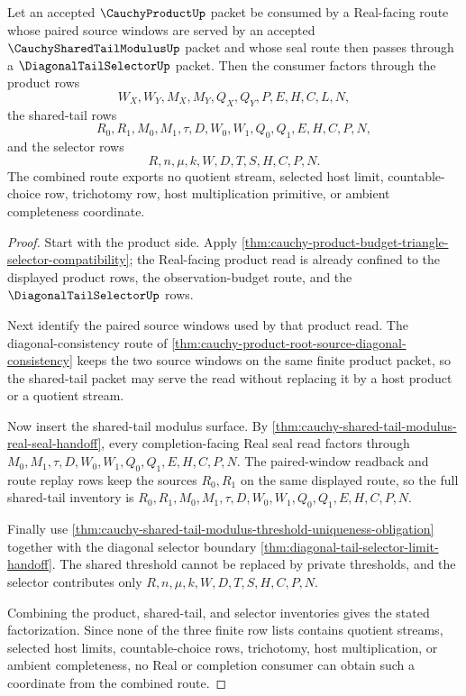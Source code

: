 \begin{theorem}
\label{thm:cauchy-product-shared-tail-selector-factorization}
Let an accepted $\CauchyProductUp$ packet be consumed by a Real-facing route whose paired source windows are served by an accepted $\CauchySharedTailModulusUp$ packet and whose seal route then passes through a $\DiagonalTailSelectorUp$ packet. Then the consumer factors through the product rows
$$
W_X,W_Y,M_X,M_Y,Q_X,Q_Y,P,E,H,C,L,N,
$$
the shared-tail rows
$$
R_0,R_1,M_0,M_1,\tau,D,W_0,W_1,Q_0,Q_1,E,H,C,P,N,
$$
and the selector rows
$$
R,n,\mu,k,W,D,T,S,H,C,P,N.
$$
The combined route exports no quotient stream, selected host limit, countable-choice row, trichotomy row, host multiplication primitive, or ambient completeness coordinate.
\end{theorem}
\begin{proof}
Start with the product side. Apply \autoref{thm:cauchy-product-budget-triangle-selector-compatibility}; the Real-facing product read is already confined to the displayed product rows, the observation-budget route, and the $\DiagonalTailSelectorUp$ rows.

Next identify the paired source windows used by that product read. The diagonal-consistency route of \autoref{thm:cauchy-product-root-source-diagonal-consistency} keeps the two source windows on the same finite product packet, so the shared-tail packet may serve the read without replacing it by a host product or a quotient stream.

Now insert the shared-tail modulus surface. By \autoref{thm:cauchy-shared-tail-modulus-real-seal-handoff}, every completion-facing Real seal read factors through $M_0,M_1,\tau,D,W_0,W_1,Q_0,Q_1,E,H,C,P,N$. The paired-window readback and route replay rows keep the sources $R_0,R_1$ on the same displayed route, so the full shared-tail inventory is $R_0,R_1,M_0,M_1,\tau,D,W_0,W_1,Q_0,Q_1,E,H,C,P,N$.

Finally use \autoref{thm:cauchy-shared-tail-modulus-threshold-uniqueness-obligation} together with the diagonal selector boundary \autoref{thm:diagonal-tail-selector-limit-handoff}. The shared threshold cannot be replaced by private thresholds, and the selector contributes only $R,n,\mu,k,W,D,T,S,H,C,P,N$.

Combining the product, shared-tail, and selector inventories gives the stated factorization. Since none of the three finite row lists contains quotient streams, selected host limits, countable-choice rows, trichotomy, host multiplication, or ambient completeness, no Real or completion consumer can obtain such a coordinate from the combined route.
\end{proof}

